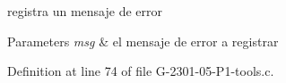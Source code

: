 registra un mensaje de error 


\begin{DoxyParams}{Parameters}
{\em msg} & el mensaje de error a registrar \\
\hline
\end{DoxyParams}


Definition at line 74 of file G-\/2301-\/05-\/\-P1-\/tools.\-c.

